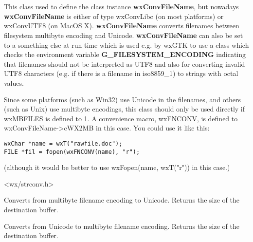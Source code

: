 %
%

\section{}\label{wxmbconvfile}

This class used to define the class instance 
{\bf wxConvFileName}, but nowadays {\bf wxConvFileName} is
either of type wxConvLibc (on most platforms) or wxConvUTF8
(on MacOS X). {\bf wxConvFileName} converts filenames between 
filesystem multibyte encoding and Unicode. {\bf wxConvFileName} 
can also be set to a something else at run-time which is used 
e.g. by wxGTK to use a class which checks the environment 
variable {\bf G_FILESYSTEM_ENCODING} indicating that filenames 
should not be interpreted as UTF8 and also for converting 
invalid UTF8 characters (e.g. if there is a filename in iso8859_1)
to strings with octal values. 

Since some platforms (such as Win32) use Unicode in the filenames,
and others (such as Unix) use multibyte encodings, this class should only
be used directly if wxMBFILES is defined to 1. A convenience macro,
wxFNCONV, is defined to wxConvFileName->cWX2MB in this case. You could
use it like this:

\begin{verbatim}
wxChar *name = wxT("rawfile.doc");
FILE *fil = fopen(wxFNCONV(name), "r");
\end{verbatim}

(although it would be better to use wxFopen(name, wxT("r")) in this case.)




<wx/strconv.h>





\label{wxmbconvfilemb2wc}


Converts from multibyte filename encoding to Unicode. Returns the size of the destination buffer.

\label{wxmbconvfilewc2mb}


Converts from Unicode to multibyte filename encoding. Returns the size of the destination buffer.

